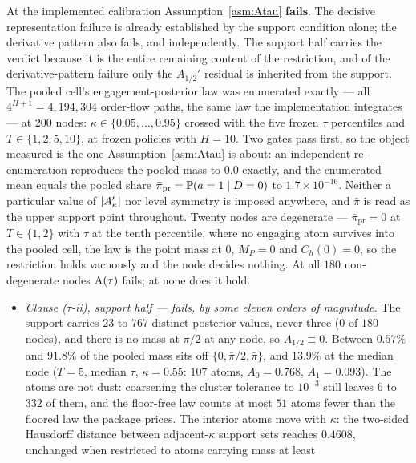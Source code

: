 \begin{remark}
\label{rem:AtauRecord}
At the implemented calibration Assumption~\ref{asm:Atau} \textbf{fails}. The decisive representation
failure is already established by the support condition alone; the derivative pattern also fails, and
independently. The support half carries the verdict because it is the entire remaining content of
the restriction, and of the derivative-pattern failure only the $A_{1/2}'$ residual is inherited
from the support. The pooled cell's engagement-posterior law was enumerated exactly --- all
$4^{H+1} = 4{,}194{,}304$ order-flow paths, the same law the implementation integrates --- at $200$
nodes: $\kappa \in \{0.05,\dots,0.95\}$ crossed with the five frozen $\tau$ percentiles and
$T \in \{1,2,5,10\}$, at frozen policies with $H = 10$. Two gates pass first, so the object measured
is the one Assumption~\ref{asm:Atau} is about: an independent re-enumeration reproduces the pooled
mass to $0.0$ exactly, and the enumerated mean equals the pooled share
$\bar\pi_{\mathrm{pr}} = \mathbb{P}(a=1\mid D=0)$ to $1.7\times10^{-16}$. Neither a particular value of
$|A'_{\kappa}|$ nor level symmetry is imposed anywhere, and $\bar\pi$ is read as the upper support point
throughout. Twenty nodes are degenerate --- $\bar\pi_{\mathrm{pr}} = 0$ at $T \in \{1,2\}$ with
$\tau$ at the tenth percentile, where no engaging atom survives into the pooled cell, the law is the
point mass at $0$, $M_P = 0$ and $C_h(0) = 0$, so the restriction holds vacuously and the node
decides nothing. At all $180$ non-degenerate nodes $\mathrm{A}(\tau)$ fails; at none does it hold.
\begin{itemize}[leftmargin=1.6em,itemsep=3pt]
\item \emph{Clause ($\tau$-ii), support half --- fails, by some eleven orders of magnitude.} The
  support carries $23$ to $767$ distinct posterior values, never three ($0$ of $180$ nodes), and
  there is no mass at $\bar\pi/2$ at any node, so $A_{1/2} \equiv 0$. Between $0.57\%$ and $91.8\%$
  of the pooled mass sits off $\{0,\bar\pi/2,\bar\pi\}$, and $13.9\%$ at the median node
  ($T = 5$, median $\tau$, $\kappa = 0.55$: $107$ atoms, $A_0 = 0.768$, $A_1 = 0.093$). The atoms are
  not dust: coarsening the cluster tolerance to $10^{-3}$ still leaves $6$ to $332$ of them, and the
  floor-free law counts at most $51$ atoms fewer than the floored law the package prices. The
  interior atoms move with $\kappa$: the two-sided Hausdorff distance between adjacent-$\kappa$
  support sets reaches $0.4608$, unchanged when restricted to atoms carrying mass at least

\end{itemize}
\end{remark}
